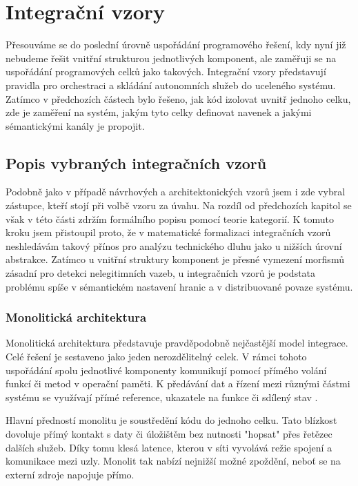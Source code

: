 \documentclass[FM,DP,fonts]{tulthesis}
\begin{document}
\section{Integrační vzory}
\label{chapter:integration_patterns}
Přesouváme se do poslední úrovně uspořádání programového řešení, kdy nyní již nebudeme řešit vnitřní strukturou jednotlivých komponent, ale zaměřuji se na uspořádání programových celků jako takových. Integrační vzory představují pravidla pro orchestraci a skládání autonomních služeb do uceleného systému. Zatímco v předchozích částech bylo řešeno, jak kód izolovat uvnitř jednoho celku, zde je zaměření na systém, jakým tyto celky definovat navenek a jakými sémantickými kanály je propojit.

\subsection{Popis vybraných integračních vzorů}
Podobně jako v případě návrhových a architektonických vzorů jsem i zde vybral zástupce, kteří stojí při volbě vzoru za úvahu. Na rozdíl od předchozích kapitol se však v této části zdržím formálního popisu pomocí teorie kategorií. K tomuto kroku jsem přistoupil proto, že v matematické formalizaci integračních vzorů neshledávám takový přínos pro analýzu technického dluhu jako u nižších úrovní abstrakce. Zatímco u vnitřní struktury komponent je přesné vymezení morfismů zásadní pro detekci nelegitimních vazeb, u integračních vzorů je podstata problému spíše v sémantickém nastavení hranic a v distribuované povaze systému.

\subsubsection{Monolitická architektura}
Monolitická architektura představuje pravděpodobně nejčastější model integrace. Celé řešení je sestaveno jako jeden nerozdělitelný celek. V rámci tohoto uspořádání spolu jednotlivé komponenty komunikují pomocí přímého volání funkcí či metod v operační paměti. K předávání dat a řízení mezi různými částmi systému se využívají přímé reference, ukazatele na funkce či sdílený stav \parencite{khan-software-architectures}.

Hlavní předností monolitu je soustředění kódu do jednoho celku. Tato blízkost dovoluje přímý kontakt s daty či úložištěm bez nutnosti "hopsat" přes řetězec dalších služeb. Díky tomu klesá latence, kterou v síti vyvolává režie spojení a komunikace mezi uzly. Monolit tak nabízí nejnižší možné zpoždění, neboť se na externí zdroje napojuje přímo.
\end{document}

